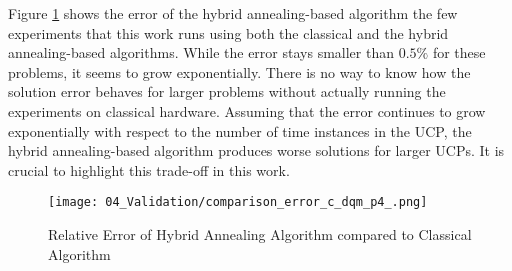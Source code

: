 Figure \ref{figure:evaluation.comparison.error} shows the error of the hybrid annealing-based algorithm the few experiments that this work runs using both the classical and the hybrid annealing-based algorithms.
While the error stays smaller than $0.5\%$ for these problems, it seems to grow exponentially.
There is no way to know how the solution error behaves for larger problems without actually running the experiments on classical hardware.
Assuming that the error continues to grow exponentially with respect to the number of time instances in the UCP, the hybrid annealing-based algorithm produces worse solutions for larger UCPs.
It is crucial to highlight this trade-off in this work.

\begin{figure}
  \centering
  \texttt{[image: 04\_Validation/comparison\_error\_c\_dqm\_p4\_.png]}
  \caption{Relative Error of Hybrid Annealing Algorithm compared to Classical Algorithm}
  \label{figure:evaluation.comparison.error}
\end{figure}
